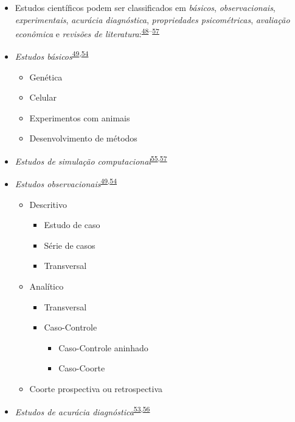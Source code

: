 \documentclass[
]{book}
\begin{document}
\begin{itemize}
\item
  Estudos científicos podem ser classificados em \emph{básicos}, \emph{observacionais}, \emph{experimentais}, \emph{acurácia diagnóstica}, \emph{propriedades psicométricas}, \emph{avaliação econômica} e \emph{revisões de literatura}:\textsuperscript{\protect\hyperlink{ref-Grant2009}{48}--\protect\hyperlink{ref-chipman2022}{57}}
\item
  \emph{Estudos básicos}\textsuperscript{\protect\hyperlink{ref-Suxfct2014}{49},\protect\hyperlink{ref-Chidambaram2019}{54}}

  \begin{itemize}
  \item
    Genética
  \item
    Celular
  \item
    Experimentos com animais
  \item
    Desenvolvimento de métodos
  \end{itemize}
\item
  \emph{Estudos de simulação computacional}\textsuperscript{\protect\hyperlink{ref-Erdemir2020}{55},\protect\hyperlink{ref-chipman2022}{57}}
\item
  \emph{Estudos observacionais}\textsuperscript{\protect\hyperlink{ref-Suxfct2014}{49},\protect\hyperlink{ref-Chidambaram2019}{54}}

  \begin{itemize}
  \item
    Descritivo

    \begin{itemize}
    \item
      Estudo de caso
    \item
      Série de casos
    \item
      Transversal
    \end{itemize}
  \item
    Analítico

    \begin{itemize}
    \item
      Transversal
    \item
      Caso-Controle

      \begin{itemize}
      \item
        Caso-Controle aninhado
      \item
        Caso-Coorte
      \end{itemize}
    \end{itemize}
  \item
    Coorte prospectiva ou retrospectiva
  \end{itemize}
\item
  \emph{Estudos de acurácia diagnóstica}\textsuperscript{\protect\hyperlink{ref-Chassuxe92019}{53},\protect\hyperlink{ref-Yang2021}{56}}


\end{itemize}
\end{document}
